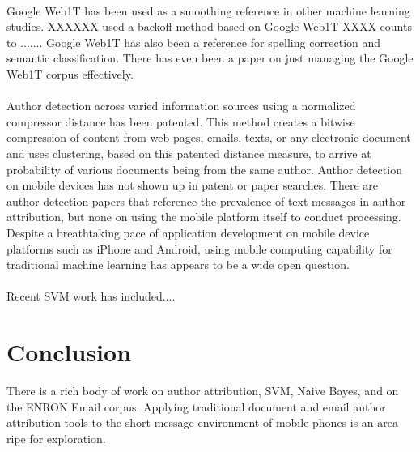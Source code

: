 	\paragraph{} Google Web1T has been used as a smoothing reference in other machine learning studies.  XXXXXX used a backoff method based on Google Web1T XXXX counts to ....... Google Web1T has also been a reference for spelling correction\cite{} and semantic classification\cite{}.  There has even been a paper on just managing the Google Web1T corpus effectively\citre{}.
	\paragraph{} Author detection across varied information sources using a normalized compressor distance has been patented.  This method creates a bitwise compression of content from web pages, emails, texts, or any electronic document and uses clustering, based on this patented distance measure, to arrive at probability of various  documents being from the same author.\cite{_method_????}  Author detection on mobile devices has not shown up in patent or paper searches.  There are author detection papers that reference the prevalence of text messages in author attribution, but none on using the mobile platform itself to conduct processing.  Despite a breathtaking pace of application development on mobile device platforms such as iPhone and Android, using mobile computing capability for traditional machine learning has appears to be a wide open question.
	\paragraph{} Recent SVM work has included....

\section{Conclusion} There is a rich body of work on author attribution, SVM, Naive Bayes, and on the ENRON Email corpus.  Applying traditional document and email author attribution tools to the short message environment of mobile phones is an area ripe for exploration.





